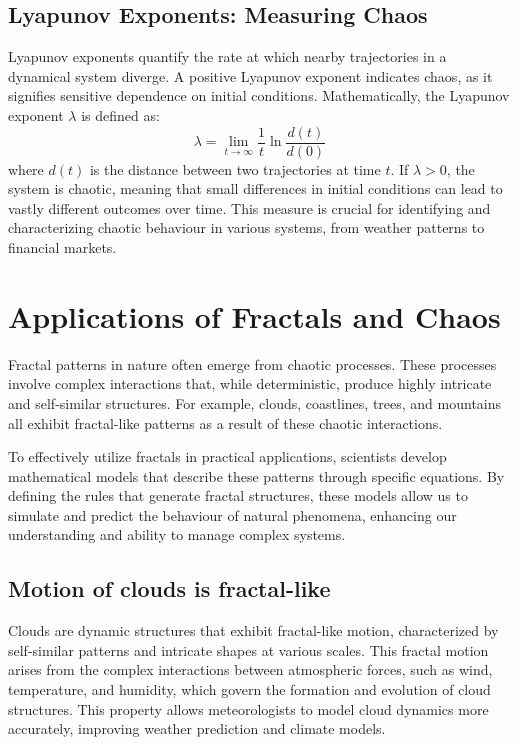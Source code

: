 \documentclass[12pt]{article}
\begin{document}
\newpage

\subsection{Lyapunov Exponents: Measuring Chaos}
Lyapunov exponents quantify the rate at which nearby trajectories in a dynamical system diverge. A positive Lyapunov exponent indicates chaos, as it signifies sensitive dependence on initial conditions. Mathematically, the Lyapunov exponent \( \lambda \) is defined as:
\[
\lambda = \lim_{t \to \infty} \frac{1}{t} \ln \frac{d(t)}{d(0)}
\]
where \( d(t) \) is the distance between two trajectories at time \( t \). If \( \lambda > 0 \), the system is chaotic, meaning that small differences in initial conditions can lead to vastly different outcomes over time. This measure is crucial for identifying and characterizing chaotic behaviour in various systems, from weather patterns to financial markets.

\section{Applications of Fractals and Chaos}
Fractal patterns in nature often emerge from chaotic processes. These processes involve complex interactions that, while deterministic, produce highly intricate and self-similar structures. For example, clouds, coastlines, trees, and mountains all exhibit fractal-like patterns as a result of these chaotic interactions. 

To effectively utilize fractals in practical applications, scientists develop mathematical models that describe these patterns through specific equations. By defining the rules that generate fractal structures, these models allow us to simulate and predict the behaviour of natural phenomena, enhancing our understanding and ability to manage complex systems.


\newpage

\subsection{Motion of clouds is fractal-like}
Clouds are dynamic structures that exhibit fractal-like motion, characterized by self-similar patterns and intricate shapes at various scales. This fractal motion arises from the complex interactions between atmospheric forces, such as wind, temperature, and humidity, which govern the formation and evolution of cloud structures. This property allows meteorologists to model cloud dynamics more accurately, improving weather prediction and climate models.
\end{document}
